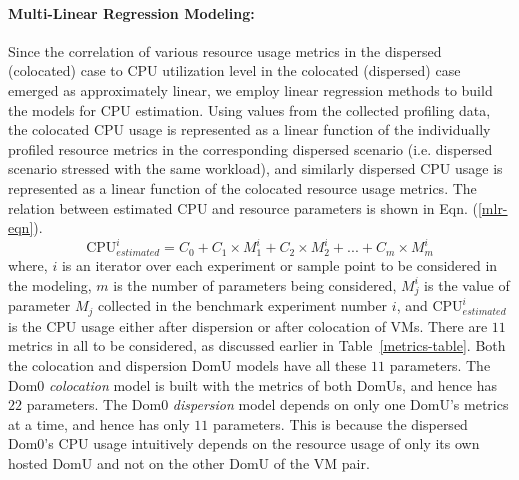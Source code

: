 \paragraph{Multi-Linear Regression Modeling: }
Since the correlation of various resource usage metrics 
in the dispersed (colocated)
case to CPU utilization level in the colocated (dispersed) 
case emerged as approximately linear, we employ 
linear regression methods to build the models for CPU estimation.
Using values from the collected profiling data,
the colocated CPU usage is represented as 
a linear function of the individually profiled resource metrics
in the corresponding dispersed scenario (i.e. dispersed scenario
stressed with the same workload),
and similarly dispersed CPU usage is represented as a linear function of 
the colocated resource usage metrics.
The relation between estimated CPU and resource parameters is shown
in Eqn. (\ref{mlr-eqn}).
\begin{equation}
\mbox{CPU}^{i}_{estimated} = C_{0} + C_{1} \times M^{i}_{1} + C_{2} \times M^{i}_{2} + ... + C_{m} \times M^{i}_{m}
\label{mlr-eqn}
\end{equation}
where, $i$ is an iterator over each experiment or sample point
to be considered in the modeling, $m$ is
the number of parameters being considered, $M^{i}_{j}$ is
the value of parameter $M_{j}$ collected in the benchmark experiment number
$i$, and $\mbox{CPU}^{i}_{estimated}$ is the CPU usage 
either after dispersion or after colocation of VMs.
There are $11$ metrics in all to be considered, as discussed 
earlier in Table~\ref{metrics-table}. 
Both the colocation and dispersion DomU models have all these $11$ parameters.
The Dom0 \textit{colocation} model is built
with the metrics of both DomUs, and hence has $22$ parameters. 
The Dom0 \textit{dispersion} model 
depends on only one DomU's metrics at a time, and hence has only $11$
parameters.
This is because the dispersed Dom0's CPU usage intuitively
depends on the resource usage of only its own hosted DomU and 
not on the other DomU of the VM pair.

